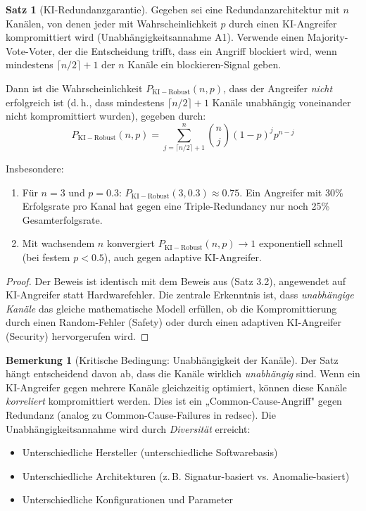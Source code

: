 \documentclass[a4paper,12pt]{article}
\theoremstyle{definition}
\newtheorem{satz}{Satz}
\newtheorem{bemerkung}{Bemerkung}
\begin{document}
\begin{satz}[KI-Redundanzgarantie]
\label{satz:ki_redundanzgarantie}
Gegeben sei eine Redundanzarchitektur mit $n$ Kanälen, von denen jeder mit Wahrscheinlichkeit $p$ durch einen KI-Angreifer kompromittiert wird (Unabhängigkeitsannahme A1). Verwende einen Majority-Vote-Voter, der die Entscheidung trifft, dass ein Angriff blockiert wird, wenn mindestens $\lceil n/2 \rceil + 1$ der $n$ Kanäle ein blockieren-Signal geben.

Dann ist die Wahrscheinlichkeit $P_{\mathrm{KI-Robust}}(n,p)$, dass der Angreifer \emph{nicht} erfolgreich ist (d.\,h., dass mindestens $\lceil n/2 \rceil + 1$ Kanäle unabhängig voneinander nicht kompromittiert wurden), gegeben durch:
\begin{equation}
P_{\mathrm{KI-Robust}}(n,p) = \sum_{j = \lceil n/2 \rceil + 1}^{n} \binom{n}{j} (1-p)^j p^{n-j}
\end{equation}

Insbesondere:
\begin{enumerate}
	\item Für $n = 3$ und $p = 0.3$: $P_{\mathrm{KI-Robust}}(3, 0.3) \approx 0.75$. Ein Angreifer mit 30\% Erfolgsrate pro Kanal hat gegen eine Triple-Redundancy nur noch 25\% Gesamterfolgsrate.
	\item Mit wachsendem $n$ konvergiert $P_{\mathrm{KI-Robust}}(n,p) \to 1$ exponentiell schnell (bei festem $p < 0.5$), auch gegen adaptive KI-Angreifer.
\end{enumerate}
\end{satz}

\begin{proof}
Der Beweis ist identisch mit dem Beweis aus \cite{Epp26a} (Satz 3.2), angewendet auf KI-Angreifer statt Hardwarefehler. Die zentrale Erkenntnis ist, dass \emph{unabhängige Kanäle} das gleiche mathematische Modell erfüllen, ob die Kompromittierung durch einen Random-Fehler (Safety) oder durch einen adaptiven KI-Angreifer (Security) hervorgerufen wird.
\end{proof}

\begin{bemerkung}[Kritische Bedingung: Unabhängigkeit der Kanäle]
Der Satz hängt entscheidend davon ab, dass die Kanäle wirklich \emph{unabhängig} sind. Wenn ein KI-Angreifer gegen mehrere Kanäle gleichzeitig optimiert, können diese Kanäle \emph{korreliert} kompromittiert werden. Dies ist ein „Common-Cause-Angriff" gegen Redundanz (analog zu Common-Cause-Failures in redsec). Die Unabhängigkeitsannahme wird durch \emph{Diversität} erreicht:
\begin{itemize}
	\item Unterschiedliche Hersteller (unterschiedliche Softwarebasis)
	\item Unterschiedliche Architekturen (z.\,B. Signatur-basiert vs. Anomalie-basiert)
	\item Unterschiedliche Konfigurationen und Parameter
\end{itemize}
\end{bemerkung}
\end{document}
